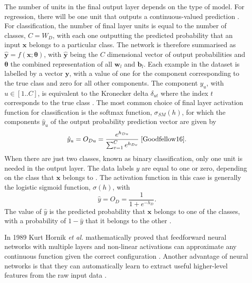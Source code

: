 \documentclass[12pt]{article}
\begin{document}
The number of units in the final output layer depends on the type of model. For regression, there will be one unit that outputs a continuous-valued prediction \cite{Goodfellow16}. For classification, the number of final layer units is equal to the number of classes, $C=W_D$, with each one outputting the predicted probability that an input $\bm{x}$ belongs to a particular class. The network is therefore summarised as $\hat{\bm{y}}=f(\bm{x};\bm\theta)$, with $\hat{\bm{y}}$ being the $C$ dimensional vector of output probabilities and $\bm\theta$ the combined representation of all $\bm{w}_l$ and $\bm{b}_l$. Each example in the dataset is labelled by a vector $\bm{y}$, with a value of one for the component corresponding to the true class and zero for all other components. The component $y_u$, with $u\in[1..C]$, is equivalent to the Kronecker delta $\delta_{ut}$ where the index $t$ corresponds to the true class \cite{Goodfellow16}. The most common choice of final layer activation function for classification is the softmax function, $\sigma_{SM}(h)$, for which the components $\hat{y}_u$ of the output probability prediction vector are given by
\begin{equation}
\hat{y}_u=O_{Du}=\frac{e^{h_{Du}}}{\sum_{v=1}^{C}e^{h_{Dv}}}\;\cite{Goodfellow16}.
\end{equation} 
When there are just two classes, known as binary classification, only one unit is needed in the output layer. The data labels $y$ are equal to one or zero, depending on the class that $\bm{x}$ belongs to \cite{Goodfellow16}. The activation function in this case is generally the logistic sigmoid function, $\sigma(h)$, with
\begin{equation}
\hat{y}=O_D=\frac{1}{1+e^{-h_D}}.
\end{equation}
The value of $\hat{y}$ is the predicted probability that $\bm{x}$ belongs to one of the classes, with a probability of $1-\hat{y}$ that it belongs to the other \cite{Goodfellow16}. 

In 1989 Kurt Hornik \textit{et al.} mathematically proved that feedforward neural networks with multiple layers and non-linear activations can approximate any continuous function given the correct configuration \cite{Hornik89}. Another advantage of neural networks is that they can automatically learn to extract useful higher-level features from the raw input data \cite{Haykin98}.
\end{document}
